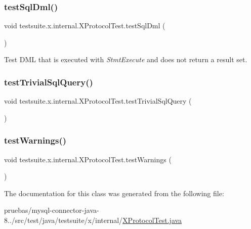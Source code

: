 \subsubsection{\texorpdfstring{test\+Sql\+Dml()}{testSqlDml()}}
{\footnotesize\ttfamily void testsuite.\+x.\+internal.\+X\+Protocol\+Test.\+test\+Sql\+Dml (\begin{DoxyParamCaption}{ }\end{DoxyParamCaption})}

Test D\+ML that is executed with {\itshape Stmt\+Execute} and does not return a result set. \mbox{\label{classtestsuite_1_1x_1_1internal_1_1_x_protocol_test_a8127d02ed98a47d15c02414eae564339}} 
\subsubsection{\texorpdfstring{test\+Trivial\+Sql\+Query()}{testTrivialSqlQuery()}}
{\footnotesize\ttfamily void testsuite.\+x.\+internal.\+X\+Protocol\+Test.\+test\+Trivial\+Sql\+Query (\begin{DoxyParamCaption}{ }\end{DoxyParamCaption})}

\mbox{\label{classtestsuite_1_1x_1_1internal_1_1_x_protocol_test_a6f54c8fce78c6b4a5b499b75fb12a897}} 
\subsubsection{\texorpdfstring{test\+Warnings()}{testWarnings()}}
{\footnotesize\ttfamily void testsuite.\+x.\+internal.\+X\+Protocol\+Test.\+test\+Warnings (\begin{DoxyParamCaption}{ }\end{DoxyParamCaption})}



The documentation for this class was generated from the following file\+:\begin{DoxyCompactItemize}
\item 
pruebas/mysql-\/connector-\/java-\/8../src/test/java/testsuite/x/internal/\mbox{\hyperlink{_x_protocol_test_8java}{X\+Protocol\+Test.\+java}}\end{DoxyCompactItemize}
